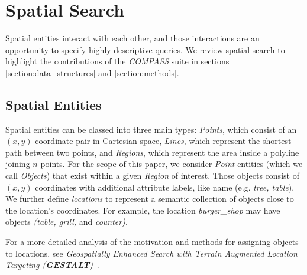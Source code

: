 \section{Spatial Search}
\label{section:background}
Spatial entities interact with each other, and those interactions are an opportunity to specify highly descriptive queries.
We review spatial search to highlight the contributions of the \emph{COMPASS} suite in sections \ref{section:data_structures} and \ref{section:methods}.
\subsection{Spatial Entities}
\par{
    Spatial entities can be classed into three main types: \textit{Points}, which consist of an $(x,y)$ coordinate pair in Cartesian space, \textit{Lines}, which represent the shortest path between two points, and \textit{Regions}, which represent the area inside a polyline joining $n$ points. %
    For the scope of this paper, we consider \textit{Point} entities (which we call  \textit{Objects}) that exist within a given \textit{Region} of interest.
    Those objects consist of $(x,y)$ coordinates with additional attribute labels, like name (e.g. \textit{tree, table}).
    We further define \textit{locations} to represent a semantic collection of objects close to the location's coordinates. 
    For example, the location \textit{burger\_shop} may have objects \textit{(table, grill,} and \textit{counter)}.
    
    For a more detailed analysis of the motivation and methods for assigning objects to locations, see \textit{Geospatially Enhanced Search with Terrain Augmented Location Targeting (\textbf{GESTALT})}~\cite{Osul2023}.
}


